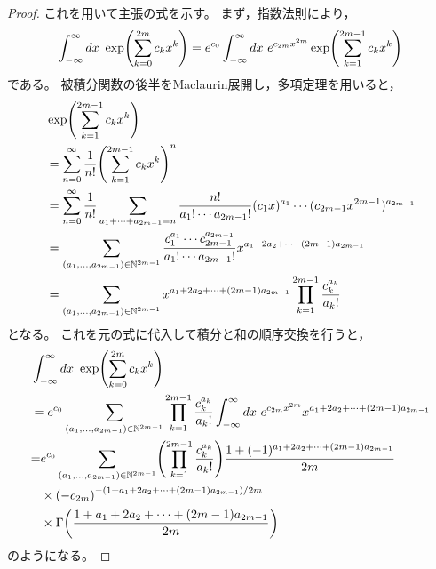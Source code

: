 \documentclass[a4paper,draft]{ltjsarticle}
\begin{document}
\begin{prop}[Gauss積分の一般化 その2]
\begin{proof}
        これを用いて主張の式を示す。
        まず，指数法則により，
        \begin{equation}
            \int_{-\infty}^\infty dx\ \fun{\exp}{\sum_{k=0}^{2m} c_k x^k}
            =e^{c_0}\int_{-\infty}^\infty dx\ e^{c_{2m}x^{2m}}\fun{\exp}{\sum_{k=1}^{2m-1}c_k x^k}
        \end{equation}
        である。
        被積分関数の後半をMaclaurin展開し，多項定理を用いると，
        \begin{align}
            &\exp\pare{\sum_{k=1}^{2m-1}c_k x^k}
            \\
            &=\sum_{n=0}^\infty\dfrac{1}{n!}\pare{\sum_{k=1}^{2m-1}c_k x^k}^n
            \\
            &=\sum_{n=0}^\infty\dfrac{1}{n!}\sum_{a_1+\cdots+a_{2m-1}=n}\dfrac{n!}{a_1!\cdots a_{2m-1}!}(c_1 x)^{a_1}\cdots (c_{2m-1}x^{2m-1})^{a_{2m-1}}
            \\
            &=\sum_{(a_1,\ldots,a_{2m-1})\in\N^{2m-1}}
            \dfrac{
            c^{a_1}_1\cdots c^{a_{2m-1}}_{2m-1}
            }{a_1!\cdots a_{2m-1}!}
            x^{a_1+2a_2+\cdots+(2m-1)a_{2m-1}}
            \\
            &=
            \sum_{(a_1,\ldots,a_{2m-1})\in\N^{2m-1}}
            x^{a_1+2a_2+\cdots+(2m-1)a_{2m-1}}
            \prod_{k=1}^{2m-1}\dfrac{c^{a_k}_k}{a_k!}
        \end{align}
        となる。
        これを元の式に代入して積分と和の順序交換を行うと，
        \begin{align}
            &\int_{-\infty}^\infty dx\ \fun{\exp}{\sum_{k=0}^{2m}c_kx^k}
            \\
            &=e^{c_0}\sum_{\pare{a_1,\ldots,a_{2m-1}}\in\N^{2m-1}}
            \prod_{k=1}^{2m-1}\dfrac{c_k^{a_k}}{a_k!}
            \int_{-\infty}^\infty dx\ e^{c_{2m}x^{2m}}x^{a_1+2a_2+\cdots+\pare{2m-1}a_{2m-1}}
            \\
            &
            \begin{aligned}
            =&e^{c_0}\sum_{\pare{a_1,\ldots,a_{2m-1}}\in\N^{2m-1}}
            \pare{\prod_{k=1}^{2m-1}\dfrac{c_k^{a_k}}{a_k!}}
            \dfrac{1+(-1)^{a_1+2a_2+\cdots+\pare{2m-1}a_{2m-1}}}{2m}
            \\
            &\times
            \pare{-c_{2m}}^{-(1+a_1+2a_2+\cdots+(2m-1)a_{2m-1})/2m}
            \\
            &\times
            \fun{\Gamma}{\dfrac{1+a_1+2a_2+\cdots+(2m-1)a_{2m-1}}{2m}}
            \end{aligned}
        \end{align}
        のようになる。


\end{proof}
\end{prop}
\end{document}
